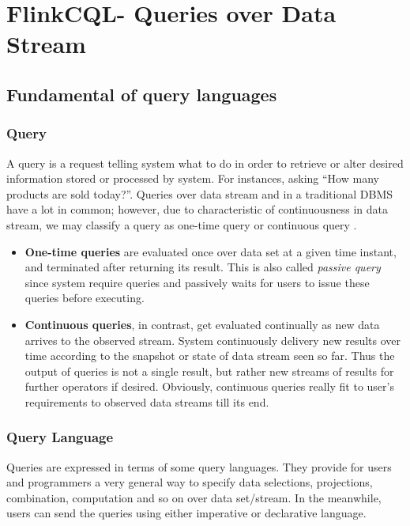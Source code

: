 
\chapter{FlinkCQL- Queries over Data Stream}

\ifpdf
    \graphicspath{{Chapter4/Figs/Raster/}{Chapter4/Figs/PDF/}{Chapter4/Figs/}}
\else
    \graphicspath{{Chapter4/Figs/Vector/}{Chapter4/Figs/}}
\fi

\section{Fundamental of query languages}
\subsection*{Query}

A query is a request telling system what to do in order to retrieve or alter desired information stored or processed by system. For instances, asking ``How many products are sold today?''. Queries over data stream and in a traditional DBMS have a lot in common; however, due to characteristic of continuousness in data stream, we may classify a query as one-time query or continuous query \citep{Terry:1992} \citep{Babcock:2002}. 
\begin{itemize}
	\item \textbf{One-time queries} are evaluated once over data set at a given time instant, and terminated after returning its result. This is also called \textit{passive query} \citep{SmartVotex:2011} since system require queries and passively waits for users to issue these queries before executing. 
	\item \textbf{Continuous queries}, in contrast, get evaluated continually as new data arrives to the observed stream. System continuously delivery new results  over time according to the snapshot or state of data stream seen so far. Thus the output of queries is not a single result, but rather new streams of results for further operators if desired. Obviously, continuous queries really fit to user's requirements to observed data streams till its end. 
\end{itemize}


\subsection*{Query Language}
Queries are expressed in terms of some query languages. They provide for users and programmers a very general way to specify data selections, projections, combination, computation and so on over data set/stream. In the meanwhile, users can send the queries using either imperative or declarative language.

